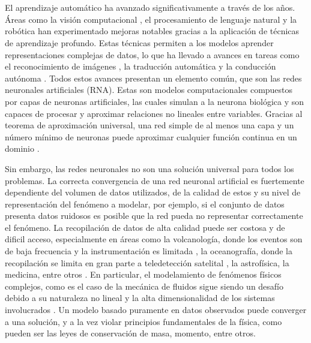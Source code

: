 \chapter*{\introductionname}
\label{cap:intro}

El aprendizaje automático ha avanzado significativamente a través de los años. Áreas como la visión computacional \cite{szeliski2011computer}, el procesamiento de lenguaje natural \cite{hirschberg2015advances} y la robótica \cite{billard2025roadmap} han experimentado mejoras 
notables gracias a la aplicación de técnicas de aprendizaje profundo. Estas técnicas permiten a los modelos aprender representaciones complejas de datos, lo que ha llevado a avances en tareas 
como el reconocimiento de imágenes \cite{li2022research}, la traducción automática \cite{bahdanau2014neural} y la conducción autónoma \cite{grigorescu2020survey}. Todos estos avances presentan
un elemento común, que son las redes neuronales artificiales (RNA). Estas son modelos computacionales compuestos por capas de neuronas artificiales, las cuales simulan
a la neurona biológica y son capaces de procesar y aproximar relaciones no lineales entre variables. Gracias al teorema de aproximación universal, una red simple de al menos una capa y un número 
mínimo de neuronas puede aproximar cualquier función continua en un dominio \cite{HORNIK1989359}.

Sin embargo, las redes neuronales no son una solución universal para todos los problemas. La correcta convergencia de una red neuronal artificial es fuertemente dependiente del volumen de datos utilizados, de la calidad de estos 
y su nivel de representación del fenómeno a modelar, por ejemplo, si el conjunto de datos presenta datos ruidosos es posible que la red pueda no representar correctamente el fenómeno. La recopilación de datos de alta calidad puede ser costosa y de dificil acceso,
especialmente en áreas como la volcanología, donde los eventos son de baja frecuencia y la instrumentación es limitada \cite{brown2015global}, la oceanografía, donde la recopilación se limita en gran parte a teledetección satelital , la astrofísica, la medicina, entre otros \cite{sonnewald2021bridging,kumari2024data,ball2010data}.
En particular, el modelamiento de fenómenos físicos complejos, como es el caso de la mecánica de fluidos sigue siendo un desafío debido a su naturaleza no lineal y la alta dimensionalidad de los sistemas involucrados \cite{brunton2020machine,duraisamy2019turbulence}.
Un modelo basado puramente en datos observados puede converger a una solución, y a la vez violar principios fundamentales de la física, como pueden ser las leyes de conservación de masa, momento, entre otros.


